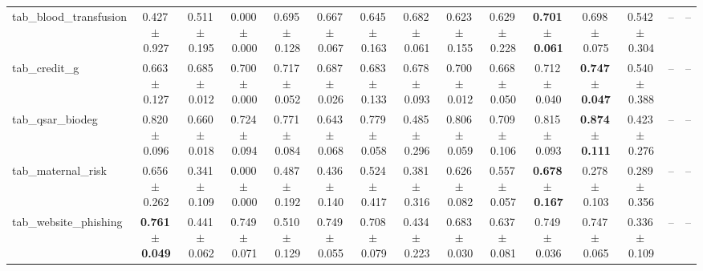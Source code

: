 \documentclass[8pt]{extarticle}
\begin{document}
\begin{longtable}{l*{14}{c}}
tab\_blood\_transfusion & 0.427\,$\pm$\,0.927 & 0.511\,$\pm$\,0.195 & 0.000\,$\pm$\,0.000 & 0.695\,$\pm$\,0.128 & 0.667\,$\pm$\,0.067 & 0.645\,$\pm$\,0.163 & 0.682\,$\pm$\,0.061 & 0.623\,$\pm$\,0.155 & 0.629\,$\pm$\,0.228 & \textbf{0.701\,$\pm$\,0.061} & 0.698\,$\pm$\,0.075 & 0.542\,$\pm$\,0.304 & -- & -- \\
tab\_credit\_g & 0.663\,$\pm$\,0.127 & 0.685\,$\pm$\,0.012 & 0.700\,$\pm$\,0.000 & 0.717\,$\pm$\,0.052 & 0.687\,$\pm$\,0.026 & 0.683\,$\pm$\,0.133 & 0.678\,$\pm$\,0.093 & 0.700\,$\pm$\,0.012 & 0.668\,$\pm$\,0.050 & 0.712\,$\pm$\,0.040 & \textbf{0.747\,$\pm$\,0.047} & 0.540\,$\pm$\,0.388 & -- & -- \\
tab\_qsar\_biodeg & 0.820\,$\pm$\,0.096 & 0.660\,$\pm$\,0.018 & 0.724\,$\pm$\,0.094 & 0.771\,$\pm$\,0.084 & 0.643\,$\pm$\,0.068 & 0.779\,$\pm$\,0.058 & 0.485\,$\pm$\,0.296 & 0.806\,$\pm$\,0.059 & 0.709\,$\pm$\,0.106 & 0.815\,$\pm$\,0.093 & \textbf{0.874\,$\pm$\,0.111} & 0.423\,$\pm$\,0.276 & -- & -- \\
tab\_maternal\_risk & 0.656\,$\pm$\,0.262 & 0.341\,$\pm$\,0.109 & 0.000\,$\pm$\,0.000 & 0.487\,$\pm$\,0.192 & 0.436\,$\pm$\,0.140 & 0.524\,$\pm$\,0.417 & 0.381\,$\pm$\,0.316 & 0.626\,$\pm$\,0.082 & 0.557\,$\pm$\,0.057 & \textbf{0.678\,$\pm$\,0.167} & 0.278\,$\pm$\,0.103 & 0.289\,$\pm$\,0.356 & -- & -- \\
tab\_website\_phishing & \textbf{0.761\,$\pm$\,0.049} & 0.441\,$\pm$\,0.062 & 0.749\,$\pm$\,0.071 & 0.510\,$\pm$\,0.129 & 0.749\,$\pm$\,0.055 & 0.708\,$\pm$\,0.079 & 0.434\,$\pm$\,0.223 & 0.683\,$\pm$\,0.030 & 0.637\,$\pm$\,0.081 & 0.749\,$\pm$\,0.036 & 0.747\,$\pm$\,0.065 & 0.336\,$\pm$\,0.109 & -- & -- \\
\end{longtable}
\end{document}
